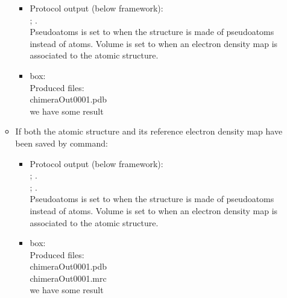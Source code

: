 \begin{itemize}
\begin{itemize}
   \begin{itemize}
     \item Protocol output (below \scipion framework):\\ ; .\\Pseudoatoms is set to  when the structure is made of pseudoatoms instead of atoms. Volume is set to  when an electron density map is associated to the atomic structure.
     \item {} box:\\Produced files:\\chimeraOut0001.pdb\\we have some result
    \end{itemize}
    
   \item If both the atomic structure and its reference electron density map have been saved by  command: 
   
   \begin{itemize}
     \item Protocol output (below \scipion framework):\\
      ; .\\
      ; .\\Pseudoatoms is set to  when the structure is made of pseudoatoms instead of atoms. Volume is set to  when an electron density map is associated to the atomic structure.
     \item {} box:\\Produced files:\\chimeraOut0001.pdb\\chimeraOut0001.mrc\\we have some result
    \end{itemize}
    
   \end{itemize} 
  
 \end{itemize}


